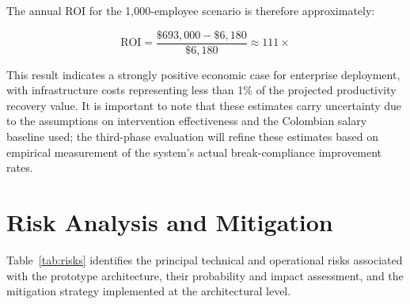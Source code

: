 \documentclass[conference]{IEEEtran}
\begin{document}
The annual ROI for the 1,000-employee scenario is therefore approximately:

\begin{equation}
  \text{ROI} = \frac{\$693{,}000 - \$6{,}180}{\$6{,}180} \approx 111\times
  \label{eq:roi}
\end{equation}

This result indicates a strongly positive economic case for enterprise deployment,
with infrastructure costs representing less than 1\% of the projected productivity
recovery value. It is important to note that these estimates carry uncertainty due
to the assumptions on intervention effectiveness and the Colombian salary baseline
used; the third-phase evaluation will refine these estimates based on empirical
measurement of the system's actual break-compliance improvement rates.

\section{Risk Analysis and Mitigation}

Table~\ref{tab:risks} identifies the principal technical and operational risks
associated with the prototype architecture, their probability and impact assessment,
and the mitigation strategy implemented at the architectural level.
\end{document}
